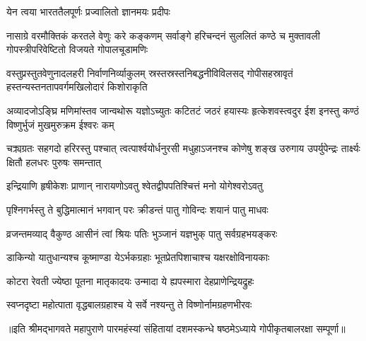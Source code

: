 

{येन त्वया भारततैलपूर्णः प्रज्वालितो ज्ञानमयः प्रदीपः}

{नासाग्रे वरमौक्तिकं करतले वेणुः करे कङ्कणम्}
{सर्वाङ्गे हरिचन्दनं सुललितं कण्ठे च मुक्तावली}
{गोपस्त्रीपरिवेष्टितो विजयते गोपालचूडामणिः}

{वस्तुप्रस्तुतवेणुनादलहरी निर्वाणनिर्व्याकुलम्}
{स्रस्तस्रस्तनिबद्धनीविविलसद् गोपीसहस्रावृतं}
{हस्तन्यस्तनतापवर्गमखिलोदारं किशोराकृति}


\fourlineindentedshloka
{अव्यादजोऽङ्घ्रि मणिमांस्तव जान्वथोरू}
{यज्ञोऽच्युतः कटितटं जठरं हयास्यः}
{हृत्केशवस्त्वदुर ईश इनस्तु कण्ठं}
{विष्णुर्भुजं मुखमुरुक्रम ईश्वरः कम्}

\fourlineindentedshloka
{चक्र्यग्रतः सहगदो हरिरस्तु पश्चात्}
{त्वत्पार्श्वयोर्धनुरसी मधुहाऽजनश्च}
{कोणेषु शङ्ख उरुगाय उपर्युपेन्द्रः}
{तार्क्ष्यः क्षितौ हलधरः पुरुषः समन्तात्}

\twolineshloka
{इन्द्रियाणि हृषीकेशः प्राणान् नारायणोऽवतु}
{श्वेतद्वीपपतिश्चित्तं मनो योगेश्वरोऽवतु}

\twolineshloka
{पृश्निगर्भस्तु ते बुद्धिमात्मानं भगवान् परः}
{क्रीडन्तं पातु गोविन्दः शयानं पातु माधवः}

\twolineshloka
{व्रजन्तमव्याद् वैकुण्ठ आसीनं त्वां श्रियः पतिः}
{भुञ्जानं यज्ञभुक् पातु सर्वग्रहभयङ्करः}

\twolineshloka
{डाकिन्यो यातुधान्यश्च कूष्माण्डा येऽर्भकग्रहाः}
{भूतप्रेतपिशाचाश्च यक्षरक्षोविनायकाः}

\twolineshloka
{कोटरा रेवती ज्येष्ठा पूतना मातृकादयः}
{उन्मादा ये ह्यपस्मारा देहप्राणेन्द्रियद्रुहः}

\twolineshloka
{स्वप्नदृष्टा महोत्पाता वृद्धबालग्रहाश्च ये}
{सर्वे नश्यन्तु ते विष्णोर्नामग्रहणभीरवः}

{॥इति श्रीमद्भागवते महापुराणे पारमहंस्यां संहितायां दशमस्कन्धे षष्ठमेऽध्याये गोपीकृतबालरक्षा सम्पूर्णा॥}